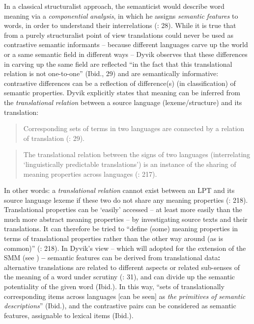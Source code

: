 In a classical structuralist approach, the semanticist would describe word meaning via a \textit{componential} \textit{analysis}, in which he assigns \textit{semantic} \textit{features} to words, in order to understand their interrelations (\citealt{langemets_translations_2005}: 28). While it is true that from a purely structuralist point of view translations could never be used as contrastive semantic informants – because different languages carve up the world or a same semantic field in different ways – Dyvik observes that these differences in carving up the same field are reflected “in the fact that this translational relation is not one-to-one” (Ibid., 29) and are semantically informative: contrastive differences can be a reflection of difference(s) (in classification) of semantic properties. Dyvik explicitly states that meaning can be inferred from the \textit{translational} \textit{relation} between a source language (lexeme/structure) and its translation:


\begin{quote}
Corresponding sets of terms in two languages are connected by a relation of translation (\citealt{langemets_translations_2005}: 29).
\end{quote}

\begin{quote}
The translational relation between the signs of two languages (interrelating ‘linguistically predictable translations’) is an instance of the sharing of meaning properties across languages (\citealt{hasselgard_complexity_1999}: 217).
\end{quote}


In other words: a \textit{translational} \textit{relation} cannot exist between an LPT and its source language lexeme if these two do not share any meaning properties (\citealt{hasselgard_complexity_1999}: 218). Translational properties can be ‘easily’ accessed – at least more easily than the much more abstract meaning properties – by investigating source texts and their translations. It can therefore be tried to “define (some) meaning properties in terms of translational properties rather than the other way around (as is common)” (\citealt{hasselgard_complexity_1999}: 218). In Dyvik’s view – which will adopted for the extension of the SMM (see ) \textbf{–} semantic features can be derived from translational data\textbf{:} alternative translations are related to different aspects or related sub-senses of the meaning of a word under scrutiny (\citealt{langemets_translations_2005}: 31), and can divide up the semantic potentiality of the given word (Ibid.). In this way, “sets of translationally corresponding items across languages [can be seen] as \textit{the} \textit{primitives} \textit{of} \textit{semantic} \textit{descriptions}” (Ibid.), and the contrastive pairs can be considered as semantic features, assignable to lexical items (Ibid.).


